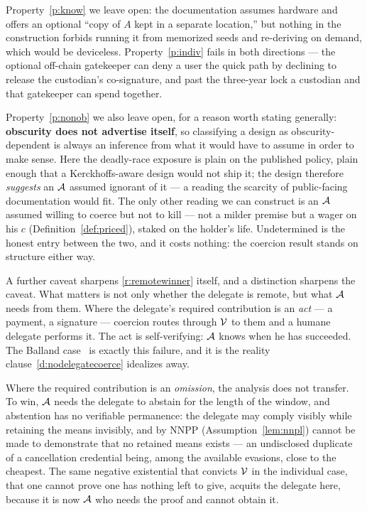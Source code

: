 Property~\ref{p:know} we leave open: the documentation assumes hardware and offers
an optional ``copy of $A$ kept in a separate location,'' but nothing in the
construction forbids running it from memorized seeds and re-deriving on demand,
which would be deviceless. Property~\ref{p:indiv} fails in both directions --- the
optional off-chain gatekeeper can deny a user the quick path by declining to
release the custodian's co-signature, and past the three-year lock a custodian and
that gatekeeper can spend together.

Property~\ref{p:nonob} we also leave open, for a reason worth stating generally:
\textbf{obscurity does not advertise itself}, so classifying a design as
obscurity-dependent is always an inference from what it would have to assume in
order to make sense. Here the deadly-race exposure is plain on the published
policy, plain enough that a Kerckhoffs-aware design would not ship it; the design
therefore \emph{suggests} an $\mathcal{A}$ assumed ignorant of it --- a reading the
scarcity of public-facing documentation would fit. The only other
reading we can construct is an $\mathcal{A}$ assumed willing to coerce but not to
kill --- not a milder premise but a wager on his $c$
(Definition~\ref{def:priced}), staked on the holder's life. Undetermined is the
honest entry between the two, and it costs nothing: the coercion result stands on
structure either way.

A further caveat sharpens \ref{r:remotewinner} itself, and a distinction sharpens
the caveat. What matters is not only whether the delegate is remote, but what
$\mathcal{A}$ needs from them. Where the delegate's required contribution is an
\emph{act} --- a payment, a signature --- coercion routes through $\mathcal{V}$ to
them and a humane delegate performs it. The act is self-verifying: $\mathcal{A}$
knows when he has succeeded. The Balland case~\cite[\S7]{denial-spiral} is exactly
this failure, and it is the reality clause~\ref{d:nodelegatecoerce} idealizes
away.

Where the required contribution is an \emph{omission}, the analysis does not
transfer. To win, $\mathcal{A}$ needs the delegate to abstain for the length of the
window, and abstention has no verifiable permanence: the delegate may comply
visibly while retaining the means invisibly, and by NNPP
(Assumption~\ref{lem:nnpl}) cannot be made to demonstrate that no retained means
exists --- an undisclosed duplicate of a cancellation credential being, among the
available evasions, close to the cheapest. The same negative existential that
convicts $\mathcal{V}$ in the individual case, that one cannot prove one has nothing
left to give, acquits the delegate here, because it is now $\mathcal{A}$ who needs
the proof and cannot obtain it.

